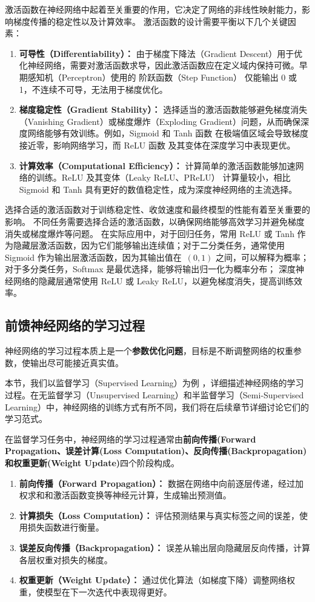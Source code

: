 激活函数在神经网络中起着至关重要的作用，它决定了网络的非线性映射能力，影响梯度传播的稳定性以及计算效率。
激活函数的设计需要平衡以下几个关键因素：
\begin{enumerate}
\item {\bf  可导性（Differentiability）：} 由于梯度下降法（Gradient Descent）用于优化神经网络，需要对激活函数求导，因此激活函数应在定义域内保持可微。早期感知机（Perceptron）使用的 阶跃函数（Step Function） 仅能输出 0 或 1，不连续不可导，无法用于梯度优化。
\item {\bf  梯度稳定性（Gradient Stability）： }选择适当的激活函数能够避免梯度消失（Vanishing Gradient）或梯度爆炸（Exploding Gradient）问题，从而确保深度网络能够有效训练。例如，Sigmoid 和 Tanh 函数 在极端值区域会导致梯度接近零，影响网络学习，而 ReLU 函数 及其变体在深度学习中表现更优。
\item {\bf  计算效率（Computational Efficiency）：} 计算简单的激活函数能够加速网络的训练。ReLU 及其变体（Leaky ReLU、PReLU） 计算量较小，相比 Sigmoid 和 Tanh 具有更好的数值稳定性，成为深度神经网络的主流选择。
\end{enumerate}

选择合适的激活函数对于训练稳定性、收敛速度和最终模型的性能有着至关重要的影响。
不同任务需要选择合适的激活函数，以确保网络能够高效学习并避免梯度消失或梯度爆炸等问题。 在实际应用中，对于回归任务，常用 ReLU 或 Tanh 作为隐藏层激活函数，因为它们能够输出连续值；对于二分类任务，通常使用 Sigmoid 作为输出层激活函数，因为其输出值在~$(0,1)$ 之间，可以解释为概率；对于多分类任务，Softmax 是最优选择，能够将输出归一化为概率分布；
深度神经网络的隐藏层通常使用 ReLU 或 Leaky ReLU，以避免梯度消失，提高训练效率。

\subsection{前馈神经网络的学习过程}
神经网络的学习过程本质上是一个{\bf 参数优化问题}，目标是不断调整网络的权重参数，使输出尽可能接近真实值。

本节，我们以监督学习（Supervised Learning）为例 ，详细描述神经网络的学习过程。在无监督学习（Unsupervised Learning）和半监督学习（Semi-Supervised Learning）中，神经网络的训练方式有所不同，我们将在后续章节详细讨论它们的学习范式。

在监督学习任务中，神经网络的学习过程通常由{\bf 前向传播(Forward Propagation、误差计算(Loss Computation)、反向传播(Backpropagation)和权重更新(Weight Update)}四个阶段构成。

\begin{enumerate}
\item {\bf  前向传播（Forward Propagation）：} 数据在网络中向前逐层传递，经过加权求和和激活函数变换等神经元计算，生成输出预测值。
\item {\bf  计算损失（Loss Computation）： }评估预测结果与真实标签之间的误差，使用损失函数进行衡量。
\item {\bf  误差反向传播（Backpropagation）：} 误差从输出层向隐藏层反向传播，计算各层权重对损失的梯度。
\item {\bf  权重更新（Weight Update）：} 通过优化算法（如梯度下降）调整网络权重，使模型在下一次迭代中表现得更好。
\end{enumerate}

